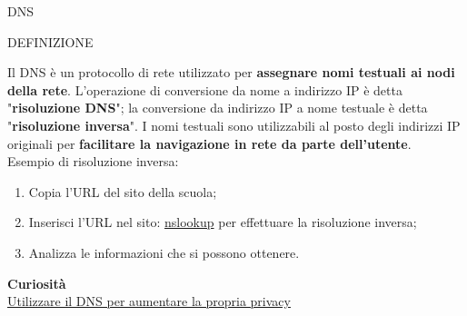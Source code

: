 \documentclass[aspectratio=1610]{beamer}
\begin{document}
\begin{frame}{DNS}
    \begin{alertblock}{DEFINIZIONE}
        \begin{minipage}{0.98\linewidth}
            \justifying
            Il DNS è un protocollo di rete utilizzato per \textbf{assegnare nomi testuali ai 
            nodi della rete}. L'operazione di conversione da nome a indirizzo IP è detta 
            "\textbf{risoluzione DNS}"; la conversione da indirizzo IP a nome testuale è detta "\textbf{risoluzione 
            inversa}". I nomi testuali sono utilizzabili al posto degli indirizzi IP originali per 
            \textbf{facilitare la navigazione in rete da parte dell'utente}.\\
            \bigskip
            Esempio di risoluzione inversa:
            \begin{enumerate}
                \pause
                \item Copia l'URL del sito della scuola;
                \pause
                \item Inserisci l'URL nel sito: \href{https://www.nslookup.io/}{nslookup} per effettuare la risoluzione inversa;
                \pause
                \item Analizza le informazioni che si possono ottenere. 
            \end{enumerate}
            \bigskip
            \tiny{\textbf{Curiosità}}\\
            \tiny{\href{https://adguard-dns.io/it/welcome.html}{Utilizzare il DNS per aumentare la propria privacy}}            
        \end{minipage}
    \end{alertblock}
\end{frame}
\end{document}
